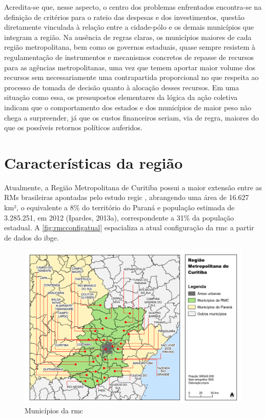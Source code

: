 	\begin{citacao}
		Acredita-se que, nesse aspecto, o centro dos problemas enfrentados encontra-se na definição de critérios para o rateio das despesas e dos investimentos, questão diretamente vinculada à relação entre a cidade-pólo e os demais municípios que integram a região. Na ausência de regras claras, os municípios maiores de cada região metropolitana, bem como os governos estaduais, quase sempre resistem à regulamentação de instrumentos e mecanismos concretos de repasse de recursos para as agências metropolitanas, uma vez que temem aportar maior volume dos recursos sem necessariamente uma contrapartida proporcional no que respeita ao processo de tomada de decisão quanto à alocação desses recursos. Em uma situação como essa, os pressupostos elementares da lógica da ação coletiva indicam que o comportamento dos estados e dos municípios de maior peso não chega a surpreender, já que os custos financeiros seriam, via de regra, maiores do que os possíveis retornos políticos auferidos.
	\end{citacao}
	
	\chapter{Características da região}
	
	Atualmente, a Região Metropolitana de Curitiba possui a maior extensão entre as RMs brasileiras apontadas pelo estudo \gls{regic} \cite{regic2008a}, abrangendo uma área de 16.627 km², o equivalente a 8\% do território do Paraná e população estimada de 3.285.251, em 2012 (Ipardes, 2013a), correspondente a 31\% da população estadual. A \autoref{fig:rmcconfigatual} espacializa a atual configuração da \gls{rmc} a partir de dados do \gls{ibge}.
	
	\begin{landscape}
		\begin{figure}
			\centering
			\caption{Municípios da \glsdesc{rmc}}
			\label{fig:rmcconfigatual}
			\includegraphics[width=0.85\linewidth]{../gis/produtos/RMC_config_atual}
		\end{figure}
	\end{landscape}

